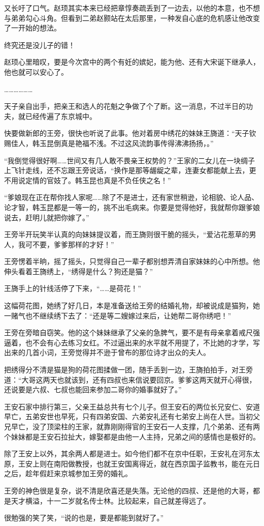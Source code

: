 又长吁了口气。赵顼其实本来已经把章惇奏疏丢到了一边去，以他的本意，也不想与弟弟勾心斗角。但看到二弟赵颢站在太后那里，一种发自心底的危机感让他改变了一开始的想法。

终究还是没儿子的错！

赵顼心里暗叹，要是今次宫中的两个有妊的嫔妃，能为他、还有大宋诞下继承人，他也就可以安心了。

………………

天子亲自出手，把亲王和选人的花魁之争做了个了断。这一消息，不过半日的功夫，就已经传遍了东京城中。

快要做新郎的王旁，很快也听说了此事。他对着房中绣花的妹妹王旖道：“天子钦赐佳人，韩玉昆倒真是艳福不浅。不过这风流韵事传得沸沸扬扬，。”

“我倒觉得很好啊……世间又有几人敢不畏亲王权势的？”王家的二女儿在一块绸子上飞针走线，还不忘跟王旁说话，“换作是那等龌龊之辈，连妻女都能献上去，更不用说定情的官妓了。韩玉昆也真是不负任侠之名！”

“爹娘现在正在帮你找人家呢……除了不是进士，还有家世稍逊，论相貌、论人品、论才智，韩玉昆都是一等一的，挑不出毛病来。你要是觉得他好，我就帮你跟爹娘说去，赶明儿就把你嫁了。”

王旁半开玩笑半认真的向妹妹提议着，而王旖则很干脆的摇头，“爱沾花惹草的男人，我可不要，爹爹那样的才好！”

王旁愣着半晌，摇了摇头，只觉得自己一辈子都别想弄清自家妹妹的心中所想。他伸头看着王旖绣上，“绣得是什么？狗还是猫？”

王旖手上的针线活停了下来，“……是荷花！”

这幅荷花图，她绣了好几日，本是准备送给王旁的结婚礼物，却被说成是猫狗，她一赌气也不继续绣下去了：“还是等二嫂嫁过来后，让她帮二哥你绣吧！”

王旁在旁暗自窃笑。他的这个妹妹继承了父亲的急脾气，要不是有母亲拿着戒尺强逼着，也不会有心去练习女红。不过逼出来的水平就不用提了，不比她的才学，写出来的几首小词，王旁觉得并不逊于曾布的那位诗才出众的夫人。

把绣得分不清是猫是狗的荷花图揉做一团，随手丢到一边，王旖拍拍手，对王旁道：“大哥这两天也就该到，还有四叔也来信说要回京。爹爹这两天就开心得很，还说要是六叔、七叔也能回来参加二哥你的婚事就好了。”

王安石家中排行第三，父亲王益总共有七个儿子。但王安石的两位长兄安仁、安道早亡，五弟安世也早死，只有四弟安国、六弟安礼还有七弟安上尚在人世。当初父兄早亡，没了顶梁柱的王家，就靠刚刚得官的王安石一人支撑，几个弟弟、还有两个妹妹都是王安石拉扯大，嫁娶都是由他一人主持，兄弟之间的感情也是极好的。

除了王安上以外，其余两人都是进士。如今他们都不在京中任职，王安礼在河东太原，王安上则在南阳做教授，也就王安国离得近，就在西京国子监教书，能在元日之后，趁年假赶来京城参加王旁的婚礼。

王旁的神色很是复杂，说不清是欣喜还是失落。无论他的四叔、还是他的大哥，都是天才横溢，十一二岁就名传士林。比较起来，自己就差得远了。

很勉强的笑了笑，“说的也是，要是都能到就好了。”

